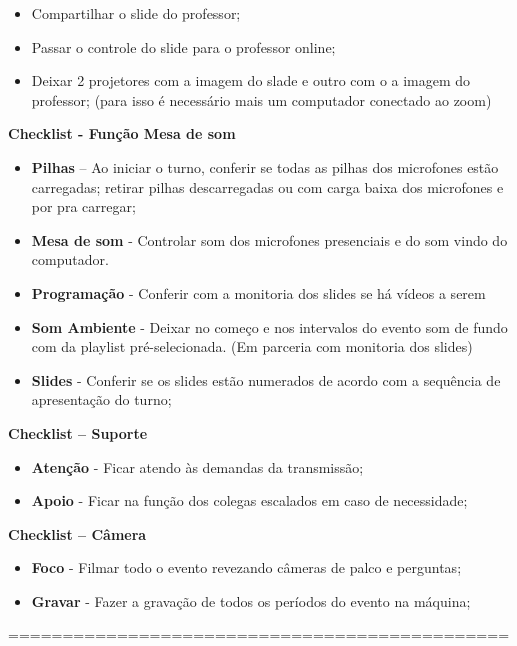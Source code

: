 \documentclass[
]{book}
\begin{document}
\begin{itemize}
\item
  Compartilhar o slide do professor;
\item
  Passar o controle do slide para o professor online;
\item
  Deixar 2 projetores com a imagem do slade e outro com o a imagem do
  professor; (para isso é necessário mais um computador conectado ao
  zoom)
\end{itemize}

\textbf{Checklist - Função Mesa de som}

\begin{itemize}
\item
  \textbf{Pilhas} -- Ao iniciar o turno, conferir se todas as pilhas dos
  microfones estão carregadas; retirar pilhas descarregadas ou com carga
  baixa dos microfones e por pra carregar;
\item
  \textbf{Mesa de som} - Controlar som dos microfones presenciais e do
  som vindo do computador.
\item
  \textbf{Programação} - Conferir com a monitoria dos slides se há
  vídeos a serem
\item
  \textbf{Som Ambiente} - Deixar no começo e nos intervalos do evento
  som de fundo com da playlist pré-selecionada. (Em parceria com
  monitoria dos slides)
\item
  \textbf{Slides} - Conferir se os slides estão numerados de acordo com
  a sequência de apresentação do turno;
\end{itemize}

\textbf{Checklist -- Suporte}

\begin{itemize}
\item
  \textbf{Atenção} - Ficar atendo às demandas da transmissão;
\item
  \textbf{Apoio} - Ficar na função dos colegas escalados em caso de
  necessidade;
\end{itemize}

\textbf{Checklist -- Câmera}

\begin{itemize}
\item
  \textbf{Foco} - Filmar todo o evento revezando câmeras de palco e
  perguntas;
\item
  \textbf{Gravar} - Fazer a gravação de todos os períodos do evento na
  máquina;
\end{itemize}

==============================================
\end{document}
